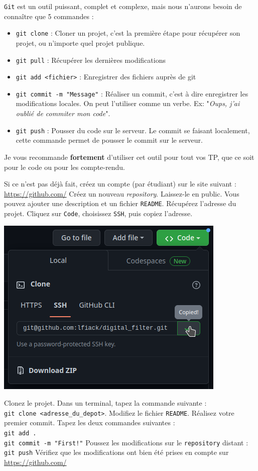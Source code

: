 \documentclass[12pt,%
addpoints,%
]{exam}
\begin{document}
\texttt{Git} est un outil puissant, complet et complexe, mais nous n'aurons besoin de connaître que 5 commandes :
\begin{itemize}
	\item \texttt{git clone} : Cloner un projet, c'est la première étape pour récupérer son projet, ou n'importe quel projet publique.
	\item \texttt{git pull} : Récupérer les dernières modifications
	\item \texttt{git add <fichier>} : Enregistrer des fichiers auprès de git
	\item \texttt{git commit -m "Message"} : Réaliser un commit, c'est à dire enregistrer les modifications locales. 
		On peut l'utiliser comme un verbe. Ex: "\emph{Oups, j'ai oublié de commiter mon code}".
	\item \texttt{git push} : Pousser du code sur le serveur. Le commit se faisant localement, cette commande permet de pousser le commit sur le serveur.
\end{itemize}


\begin{tcolorbox}
	Je vous recommande \textbf{fortement} d'utiliser cet outil pour tout vos TP, que ce soit pour le code ou pour les compte-rendu.
\end{tcolorbox}

\begin{questions}
	\question Si ce n'est pas déjà fait, créez un compte (par étudiant) sur le site suivant :
\url{https://github.com/}
	\question Créez un nouveau \emph{repository}. Laissez-le en public. Vous pouvez ajouter une description et un fichier \texttt{README}.
	\question Récupérez l'adresse du projet. Cliquez sur \texttt{Code}, choisissez \texttt{SSH}, puis copiez l'adresse.
	\begin{center}
		\includegraphics[width=.5\linewidth]{figures/git1.png}
	\end{center}
	\question Clonez le projet. Dans un terminal, tapez la commande suivante : \\
		\texttt{git clone <adresse_du_depot>}.
	\question Modifiez le fichier \texttt{README}.
	\question Réalisez votre premier commit. Tapez les deux commandes suivantes : \\
	\texttt{git add .}\\
	\texttt{git commit -m "First!"}
	\question Poussez les modifications sur le \texttt{repository} distant : \\
	\texttt{git push}
	\question Vérifiez que les modifications ont bien été prises en compte sur \url{https://github.com/}
\end{questions}
\end{document}
